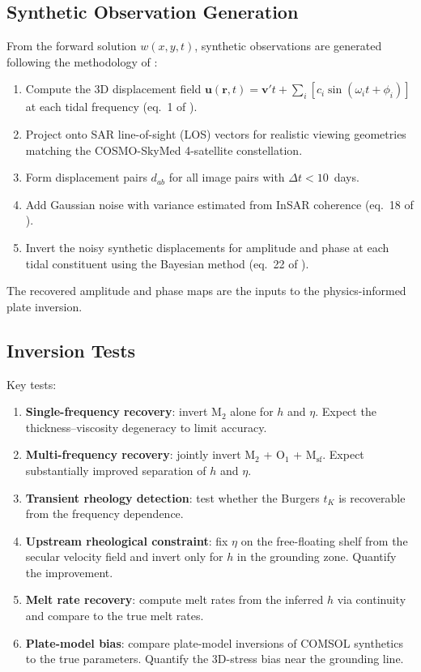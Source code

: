 \documentclass[11pt,letterpaper]{article}
\begin{document}
\subsection{Synthetic Observation Generation}
\label{sec:synth_obs}

From the forward solution $w(x,y,t)$, synthetic observations are generated following the methodology of \citet{Minchew2017}:
\begin{enumerate}
  \item Compute the 3D displacement field $\bm{u}(\bm{r}, t) = \bm{v}' t + \sum_i [c_i \sin(\omega_i t + \phi_i)]$ at each tidal frequency (eq.~1 of \citealt{Minchew2017}).
  \item Project onto SAR line-of-sight (LOS) vectors for realistic viewing geometries matching the COSMO-SkyMed 4-satellite constellation.
  \item Form displacement pairs $d_{ab}$ for all image pairs with $\Delta t < 10$~days.
  \item Add Gaussian noise with variance estimated from InSAR coherence (eq.~18 of \citealt{Minchew2017}).
  \item Invert the noisy synthetic displacements for amplitude and phase at each tidal constituent using the Bayesian method (eq.~22 of \citealt{Minchew2017}).
\end{enumerate}

The recovered amplitude and phase maps are the inputs to the physics-informed plate inversion.

\subsection{Inversion Tests}
\label{sec:synth_tests}

Key tests:
\begin{enumerate}
  \item \textbf{Single-frequency recovery}: invert M$_2$ alone for $h$ and $\eta$.  Expect the thickness--viscosity degeneracy to limit accuracy.
  \item \textbf{Multi-frequency recovery}: jointly invert M$_2$ + O$_1$ + M$_{\text{sf}}$.  Expect substantially improved separation of $h$ and $\eta$.
  \item \textbf{Transient rheology detection}: test whether the Burgers $t_K$ is recoverable from the frequency dependence.
  \item \textbf{Upstream rheological constraint}: fix $\eta$ on the free-floating shelf from the secular velocity field and invert only for $h$ in the grounding zone.  Quantify the improvement.
  \item \textbf{Melt rate recovery}: compute melt rates from the inferred $h$ via continuity and compare to the true melt rates.
  \item \textbf{Plate-model bias}: compare plate-model inversions of COMSOL synthetics to the true parameters.  Quantify the 3D-stress bias near the grounding line.
\end{enumerate}
\end{document}
